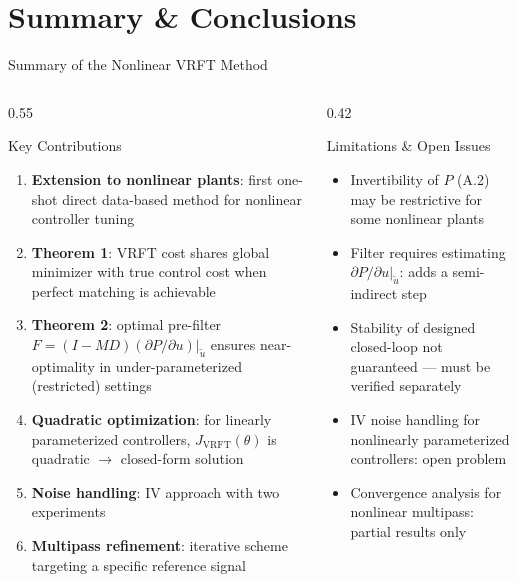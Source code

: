 \documentclass[aspectratio=169]{beamer}
\newcommand{\JJ}{J_{\mathrm{VRFT}}}
\begin{document}
\section{Summary \& Conclusions}

\begin{frame}{Summary of the Nonlinear VRFT Method}
  \begin{columns}[T]
    \begin{column}{0.55\textwidth}
      \begin{exampleblock}{Key Contributions}
        \begin{enumerate}
          \setlength{\itemsep}{0.35em}
          \item \textbf{Extension to nonlinear plants}: first one-shot direct data-based method for nonlinear controller tuning
          \item \textbf{Theorem 1}: VRFT cost shares global minimizer with true control cost when perfect matching is achievable
          \item \textbf{Theorem 2}: optimal pre-filter $F=(I-MD)(\partial P/\partial u)|_{\tilde{u}}$ ensures near-optimality in under-parameterized (restricted) settings
          \item \textbf{Quadratic optimization}: for linearly parameterized controllers, $\JJ(\theta)$ is quadratic $\to$ closed-form solution
          \item \textbf{Noise handling}: IV approach with two experiments
          \item \textbf{Multipass refinement}: iterative scheme targeting a specific reference signal
        \end{enumerate}
      \end{exampleblock}
    \end{column}
    \begin{column}{0.42\textwidth}
      \begin{alertblock}{Limitations \& Open Issues}
        \begin{itemize}
          \item Invertibility of $P$ (A.2) may be restrictive for some nonlinear plants
          \item Filter requires estimating $\partial P/\partial u|_{\tilde{u}}$: adds a semi-indirect step
          \item Stability of designed closed-loop not guaranteed --- must be verified separately
          \item IV noise handling for nonlinearly parameterized controllers: open problem
          \item Convergence analysis for nonlinear multipass: partial results only
        \end{itemize}
      \end{alertblock}
    \end{column}
  \end{columns}
\end{frame}
\end{document}
